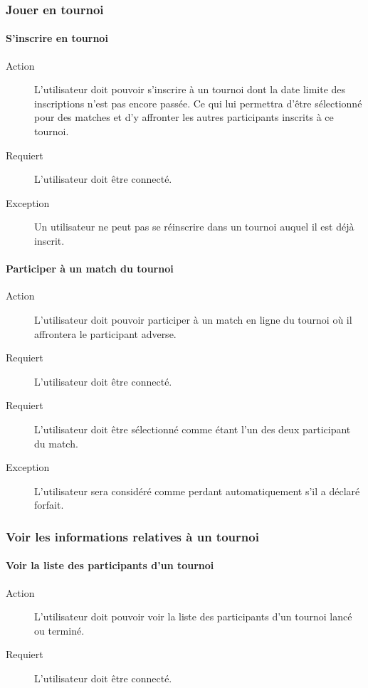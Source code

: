 \documentclass[a4paper]{article}
\begin{document}
\subsubsection{Jouer en tournoi}
\paragraph{S'inscrire en tournoi}
\begin{description}
\item[Action] L'\gls{utilisateur} doit pouvoir s'inscrire à un tournoi dont la date limite des inscriptions n'est pas encore passée.
Ce qui lui permettra d'être sélectionné pour des matches et d'y affronter les autres participants inscrits à ce tournoi.
\item[Requiert] L'\gls{utilisateur} doit être connecté.
\item[Exception] Un \gls{utilisateur} ne peut pas se réinscrire dans un tournoi auquel il est déjà inscrit.
\end{description} 

\paragraph{Participer à un match du tournoi}
\begin{description}
\item[Action] L'\gls{utilisateur} doit pouvoir participer à un match en ligne du tournoi où il affrontera le participant adverse.
\item[Requiert] L'\gls{utilisateur} doit être connecté.
\item[Requiert] L'\gls{utilisateur} doit être sélectionné comme étant l'un des deux participant du match.
\item[Exception] L'\gls{utilisateur} sera considéré comme perdant automatiquement s'il a déclaré forfait.
\end{description}

\subsubsection{Voir les informations relatives à un tournoi}
\paragraph{Voir la liste des participants d'un tournoi}
\begin{description}
\item[Action] L'\gls{utilisateur} doit pouvoir voir la liste des participants d'un tournoi lancé ou terminé.
\item[Requiert] L'\gls{utilisateur} doit être connecté.
\end{description}
\end{document}
